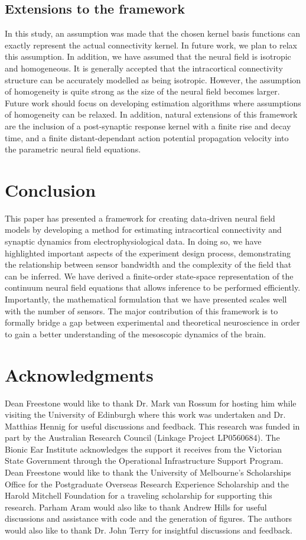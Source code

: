 \documentclass[5p,authoryear]{elsarticle}
\begin{document}
\subsection{Extensions to the framework}

In this study, an assumption was made that the chosen kernel basis functions can exactly represent the actual connectivity kernel. In future work, we plan to relax this assumption. In addition, we have assumed that the neural field is isotropic and homogeneous. It is generally accepted that the intracortical connectivity structure can be accurately modelled as being isotropic. However, the assumption of homogeneity is quite strong as the size of the neural field becomes larger. Future work should focus on developing estimation algorithms where assumptions of homogeneity can be relaxed. In addition, natural extensions of this framework are the inclusion of a post-synaptic response kernel with a finite rise and decay time, and a finite distant-dependant action potential propagation velocity into the parametric neural field equations.

\section{Conclusion}
This paper has presented a framework for creating data-driven neural field models by developing a method for estimating intracortical connectivity and synaptic dynamics from electrophysiological data. In doing so, we have highlighted important aspects of the experiment design process, demonstrating the relationship between sensor bandwidth and the complexity of the field that can be inferred. We have derived a finite-order state-space representation of the continuum neural field equations that allows inference to be performed efficiently. Importantly, the mathematical formulation that we have presented scales well with the number of sensors. The major contribution of this framework is to formally bridge a gap between experimental and theoretical neuroscience in order to gain a better understanding of the mesoscopic dynamics of the brain.



\section{Acknowledgments}
Dean Freestone would like to thank Dr. Mark van Rossum for hosting him while visiting the University of Edinburgh where this work was undertaken and Dr. Matthias Hennig for useful discussions and feedback. This research was funded in part by the Australian Research Council (Linkage Project LP0560684). The Bionic Ear Institute acknowledges the support it receives from the Victorian State Government through the Operational Infrastructure Support Program. Dean Freestone would like to thank the University of Melbourne's Scholarships Office for the Postgraduate Overseas Research Experience Scholarship and the Harold Mitchell Foundation for a traveling scholarship for supporting this research. Parham Aram would also like to thank Andrew Hills for useful discussions and assistance with code and the generation of figures. The authors would also like to thank Dr. John Terry for insightful discussions and feedback.
\end{document}
